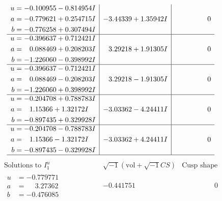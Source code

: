 \documentclass[1p]{elsarticle_modified}
\theoremstyle{definition}
\newcommand{\I}{\sqrt{-1}}
\begin{document}
$$\begin{array}{c|c|c}
\begin{aligned}
u &= -0.100955 - 0.814954 I \\
a &= -0.779621 + 0.254715 I \\
b &= -0.776258 + 0.307494 I\end{aligned}
 & -3.44339 + 1.35942 I & \phantom{-0.000000 } 0 \\ \hline\begin{aligned}
u &= -0.396637 + 0.712421 I \\
a &= \phantom{-}0.088469 + 0.208203 I \\
b &= -1.226060 - 0.398992 I\end{aligned}
 & \phantom{-}3.29218 + 1.91305 I & \phantom{-0.000000 } 0 \\ \hline\begin{aligned}
u &= -0.396637 - 0.712421 I \\
a &= \phantom{-}0.088469 - 0.208203 I \\
b &= -1.226060 + 0.398992 I\end{aligned}
 & \phantom{-}3.29218 - 1.91305 I & \phantom{-0.000000 } 0 \\ \hline\begin{aligned}
u &= -0.204708 + 0.788783 I \\
a &= \phantom{-}1.15366 + 1.32172 I \\
b &= -0.897435 + 0.329928 I\end{aligned}
 & -3.03362 - 4.24411 I & \phantom{-0.000000 } 0 \\ \hline\begin{aligned}
u &= -0.204708 - 0.788783 I \\
a &= \phantom{-}1.15366 - 1.32172 I \\
b &= -0.897435 - 0.329928 I\end{aligned}
 & -3.03362 + 4.24411 I & \phantom{-0.000000 } 0\\
 \hline 
 \end{array}$$\newpage$$\begin{array}{c|c|c}  
\text{Solutions to }I^u_{1}& \I (\text{vol} + \sqrt{-1}CS) & \text{Cusp shape}\\
 \hline 
\begin{aligned}
u &= -0.779771\phantom{ +0.000000I} \\
a &= \phantom{-}3.27362\phantom{ +0.000000I} \\
b &= -0.476085\phantom{ +0.000000I}\end{aligned}
 & -0.441751\phantom{ +0.000000I} & \phantom{-0.000000 } 0 \\ \hline\begin{aligned}

\end{aligned}
\end{array}$$
\end{document}
